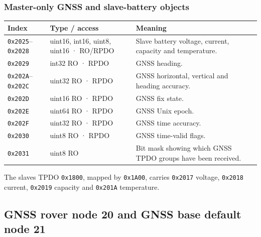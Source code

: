 \documentclass[
  10pt,
  letterpaper,
  openany]{report}
\newcounter{none} %
\begin{document}
\subsubsection{Master-only GNSS and slave-battery
objects}\label{master-only-gnss-and-slave-battery-objects}

{\def\LTcaptype{none} %
\begin{longtable}[]{@{}
  >{\raggedright\arraybackslash}p{}
  >{\raggedright\arraybackslash}p{}
  >{\raggedright\arraybackslash}p{}@{}}
\toprule\noalign{}
\begin{minipage}[b]{\linewidth}\raggedright
Index
\end{minipage} & \begin{minipage}[b]{\linewidth}\raggedright
Type / access
\end{minipage} & \begin{minipage}[b]{\linewidth}\raggedright
Meaning
\end{minipage} \\
\midrule\noalign{}
\endhead
\bottomrule\noalign{}
\endlastfoot
\texttt{0x2025}--\texttt{0x2028} & uint16, int16, uint8, uint16 ·
RO/RPDO & Slave battery voltage, current, capacity and temperature. \\
\texttt{0x2029} & int32 RO · RPDO & GNSS heading. \\
\texttt{0x202A}--\texttt{0x202C} & uint32 RO · RPDO & GNSS horizontal,
vertical and heading accuracy. \\
\texttt{0x202D} & uint16 RO · RPDO & GNSS fix state. \\
\texttt{0x202E} & uint64 RO · RPDO & GNSS Unix epoch. \\
\texttt{0x202F} & uint32 RO · RPDO & GNSS time accuracy. \\
\texttt{0x2030} & uint8 RO · RPDO & GNSS time-valid flags. \\
\texttt{0x2031} & uint8 RO & Bit mask showing which GNSS TPDO groups
have been received. \\
\end{longtable}
}

The slave\textquotesingle s TPDO \texttt{0x1800}, mapped by
\texttt{0x1A00}, carries \texttt{0x2017} voltage, \texttt{0x2018}
current, \texttt{0x2019} capacity and \texttt{0x201A} temperature.

\subsection{GNSS rover node 20 and GNSS base default node
21}\label{gnss-rover-node-20-and-gnss-base-default-node-21}
\end{document}
